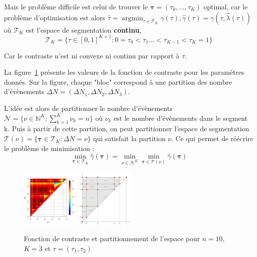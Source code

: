 \documentclass[a4paper,10pt]{article}\usepackage[]{graphicx}\usepackage[]{xcolor}
\DeclareMathOperator*{\argmin}{argmin}
\newcommand{\segspace}{\mathcal{T}_K}
\newcommand{\N}{\mathbb{N}}
\begin{document}
Mais le problème difficile est celui de trouver le $\bm\tau = (\tau_0, \dots, 
\tau_K)$ optimal, car le problème 
d'optimisation est alors $\widehat \tau = 
\argmin_{\tau\in\segspace} \widehat \gamma(\tau), 
\widehat \gamma(\tau) = \gamma (\tau, \widehat \lambda (\tau))$ où $\segspace$ 
est l'espace de segmentation \textbf{continu}, $$\segspace = 
\bigl\{ \tau \in [0,1]^{K+1} : 0 = \tau_0 < \tau_1 \dots < \tau_{K-1} < 
\tau_K = 1 \bigr\}$$

Car le contraste n'est ni convexe ni continu par rapport à $\tau$.

La figure~\ref{fig:contrast-function} présente les valeurs de la fonction de 
contraste pour les paramètres donnés. Sur la figure, chaque "bloc" correspond à
une partition des nombre d'évènements $\Delta N = (\Delta N_1, \Delta N_2, 
\Delta N_3)$.

L'idée est alors de partitionner le nombre d'évènements  $\mathcal{N} = 
\bigl\{ \nu \in \N^K : \sum_{k=1}^K \nu_k = n \bigr\}$ où $\nu_k$ est le nombre
d'évènements dans le segment k. Puis à partir de cette partition, on peut 
partitionner l'espace de segmentation $\mathcal{T}(\nu) = 
\bigl\{ \bm \tau \in \segspace : \Delta N = \nu \bigr\}$ qui satisfait la 
partition $\nu$. Ce qui permet de réécrire le problème de minimisation :
$$\min_{\bm{\tau}\in\segspace} \widehat \gamma (\bm{\tau}) = \min_{\nu \in 
\mathcal{N}^K} \min_{\bm{\tau}\in\mathcal{T}(\nu)} \widehat \gamma (\bm{\tau})$$

\begin{figure}
    \vspace{-12pt}
    \centering
    \caption{Fonction de contraste et partitionnement de l'espace pour $n=10$, $K=3$ et $\tau = (\tau_1,\tau_2)$}
    \label{fig:contrast-function}
    \includegraphics[width=0.25\textwidth]{contrast-function}
    \includegraphics[width=0.25\textwidth]{space-partitioning}
\end{figure}
\end{document}
